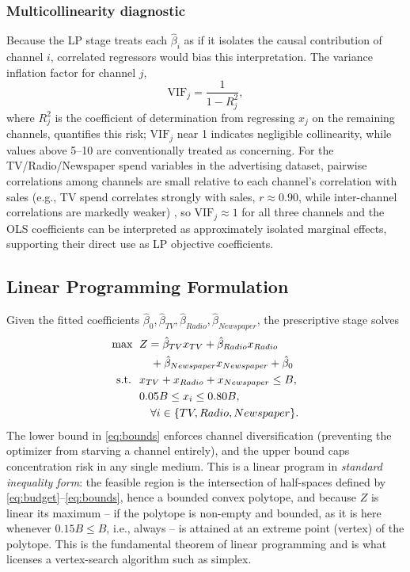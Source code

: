\documentclass[conference]{IEEEtran}
\begin{document}
\subsubsection{Multicollinearity diagnostic}
Because the LP stage treats each $\hat\beta_i$ as if it isolates the causal contribution of channel $i$, correlated regressors would bias this interpretation. The variance inflation factor for channel $j$,
\begin{equation}
\mathrm{VIF}_j = \frac{1}{1-R_j^2},
\end{equation}
where $R_j^2$ is the coefficient of determination from regressing $x_j$ on the remaining channels, quantifies this risk; $\mathrm{VIF}_j$ near 1 indicates negligible collinearity, while values above 5--10 are conventionally treated as concerning. For the TV/Radio/Newspaper spend variables in the advertising dataset, pairwise correlations among channels are small relative to each channel's correlation with sales (e.g., TV spend correlates strongly with sales, $r \approx 0.90$, while inter-channel correlations are markedly weaker) \cite{krasi_github}, so $\mathrm{VIF}_j \approx 1$ for all three channels and the OLS coefficients can be interpreted as approximately isolated marginal effects, supporting their direct use as LP objective coefficients.

\subsection{Linear Programming Formulation}
\label{sec:lp}
Given the fitted coefficients $\hat\beta_0,\hat\beta_{TV},\hat\beta_{Radio},\hat\beta_{Newspaper}$, the prescriptive stage solves
\begin{align}
\text{max } \; & Z = \hat\beta_{TV}x_{TV} + \hat\beta_{Radio}x_{Radio} \notag\\
& \quad + \hat\beta_{Newspaper}x_{Newspaper} + \hat\beta_0 \label{eq:obj}\\
\text{s.t. } \; & x_{TV} + x_{Radio} + x_{Newspaper} \le B, \label{eq:budget}\\
& 0.05B \le x_i \le 0.80B,\notag\\
&\quad \forall i \in \{TV,Radio,Newspaper\}. \label{eq:bounds}
\end{align}
The lower bound in \eqref{eq:bounds} enforces channel diversification (preventing the optimizer from starving a channel entirely), and the upper bound caps concentration risk in any single medium. This is a linear program in \emph{standard inequality form}: the feasible region is the intersection of half-spaces defined by \eqref{eq:budget}--\eqref{eq:bounds}, hence a bounded convex polytope, and because $Z$ is linear its maximum -- if the polytope is non-empty and bounded, as it is here whenever $0.15B \le B$, i.e., always -- is attained at an extreme point (vertex) of the polytope. This is the fundamental theorem of linear programming and is what licenses a vertex-search algorithm such as simplex.
\end{document}
